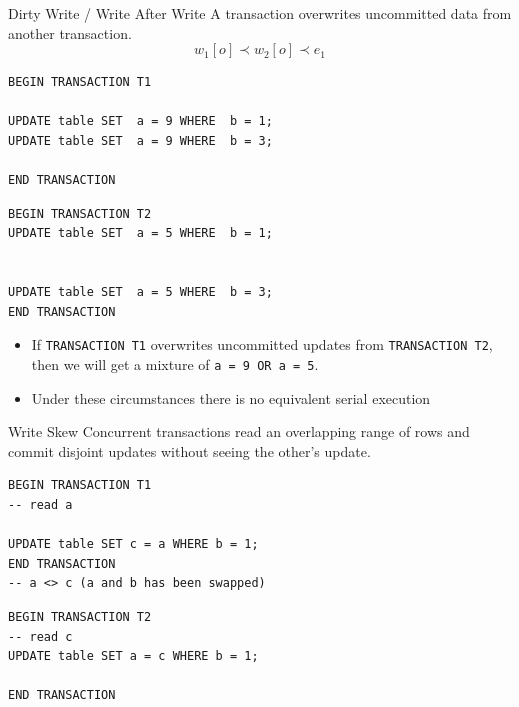 \begin{definitionbox}{Dirty Write / Write After Write}
    A transaction overwrites uncommitted data from another transaction.
    \[w_1[o] \prec w_2[o] \prec e_1\]
    \tcblower
    \begin{minipage}[t]{.49\textwidth}
        \begin{verbatim}
BEGIN TRANSACTION T1

UPDATE table SET  a = 9 WHERE  b = 1;
UPDATE table SET  a = 9 WHERE  b = 3;

END TRANSACTION
       \end{verbatim}
    \end{minipage} \hfill \begin{minipage}[t]{.49\textwidth}
        \begin{verbatim}
BEGIN TRANSACTION T2
UPDATE table SET  a = 5 WHERE  b = 1;


UPDATE table SET  a = 5 WHERE  b = 3;
END TRANSACTION
       \end{verbatim}
    \end{minipage}
    \begin{itemize}
        \item If \texttt{TRANSACTION T1} overwrites uncommitted updates from \texttt{TRANSACTION T2}, then we will get a mixture of \texttt{a = 9 OR a = 5}.
        \item Under these circumstances there is no equivalent serial execution
    \end{itemize}
\end{definitionbox}

\begin{definitionbox}{Write Skew}
    Concurrent transactions read an overlapping range of rows and commit disjoint updates without seeing the other's update.
    \tcblower
    \begin{minipage}[t]{.49\textwidth}
        \begin{verbatim}
BEGIN TRANSACTION T1
-- read a

UPDATE table SET c = a WHERE b = 1;
END TRANSACTION
-- a <> c (a and b has been swapped)
       \end{verbatim}
    \end{minipage} \hfill \begin{minipage}[t]{.49\textwidth}
        \begin{verbatim}
BEGIN TRANSACTION T2
-- read c
UPDATE table SET a = c WHERE b = 1;

END TRANSACTION
       \end{verbatim}
    \end{minipage}
\end{definitionbox}

